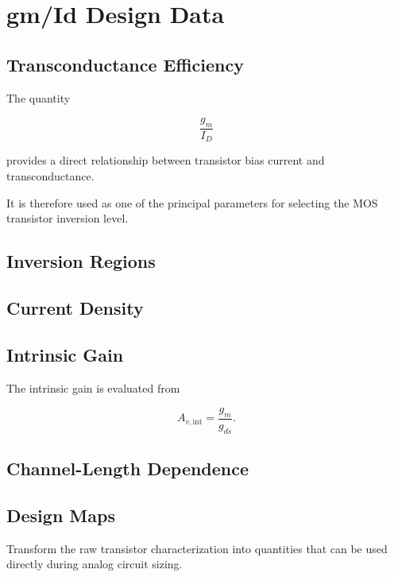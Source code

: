 
\section{gm/Id Design Data}
\label{sec:gmid_design_data}

\subsection{Transconductance Efficiency}

The quantity

\begin{equation}
	\frac{g_m}{I_D}
\end{equation}

provides a direct relationship between transistor bias current and
transconductance.

It is therefore used as one of the principal parameters for selecting
the MOS transistor inversion level.


\subsection{Inversion Regions}



\subsection{Current Density}



\subsection{Intrinsic Gain}

The intrinsic gain is evaluated from

\begin{equation}
	A_{v,\mathrm{int}}
	=
	\frac{g_m}{g_{ds}}.
\end{equation}



\subsection{Channel-Length Dependence}



\subsection{Design Maps}



\begin{designobjective}
	
	Transform the raw transistor characterization into quantities that can
	be used directly during analog circuit sizing.
	
\end{designobjective}